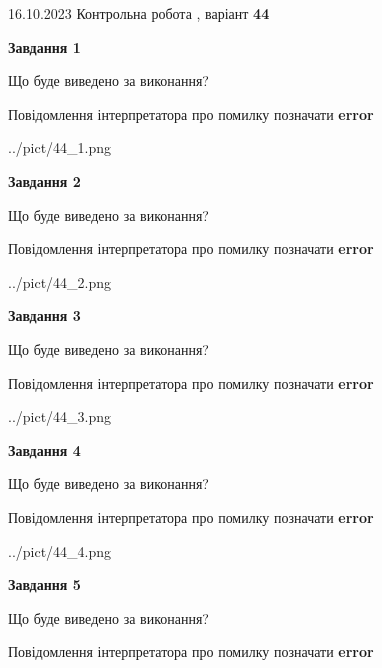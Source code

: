 \documentclass[12pt, ukrainian]{article}
\begin{document}
{\Large{16.10.2023 Контрольна робота , варіант  \No \textbf { 44 }\par}}
{
\begin {large}
{\begin {center}\textbf{Завдання 1}\end {center}}\par
Що буде виведено за виконання? \par
Повідомлення інтерпретатора про помилку позначати \textbf{error}

\begin{center}
	{../pict/44_1.png}
\end{center}
\newpage

{\begin {center}\textbf{Завдання 2}\end {center}}\par
Що буде виведено за виконання? \par
Повідомлення інтерпретатора про помилку позначати \textbf{error}

\begin{center}
	{../pict/44_2.png}
\end{center}
\newpage

{\begin {center}\textbf{Завдання 3}\end {center}}\par
Що буде виведено за виконання? \par
Повідомлення інтерпретатора про помилку позначати \textbf{error}

\begin{center}
	{../pict/44_3.png}
\end{center}
\newpage

{\begin {center}\textbf{Завдання 4}\end {center}}\par
Що буде виведено за виконання? \par
Повідомлення інтерпретатора про помилку позначати \textbf{error}

\begin{center}
	{../pict/44_4.png}
\end{center}
\newpage

{\begin {center}\textbf{Завдання 5}\end {center}}\par
Що буде виведено за виконання? \par
Повідомлення інтерпретатора про помилку позначати \textbf{error}


\end{large}}
\end{document}
